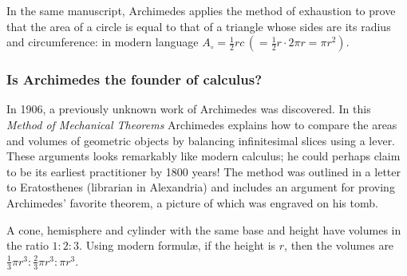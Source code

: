 In the same manuscript, Archimedes applies the method of exhaustion to prove that the area of a circle is equal to that of a triangle whose sides are its radius and circumference: in modern language $A_{\circ}=\frac 12rc \, (=\frac 12 r\cdot 2\pi r=\pi r^2).$ 


\pagebreak[3]


\subsubsection*{Is Archimedes the founder of calculus?}\label{pg:archmethod}

In 1906, a previously unknown work of Archimedes was discovered. In this \emph{Method of Mechanical Theorems} Archimedes explains how to compare the areas and volumes of geometric objects by balancing infinitesimal slices using a lever. These arguments looks remarkably like modern calculus; he could perhaps claim to be its earliest practitioner by 1800 years! The method was outlined in a letter to Eratosthenes (librarian in Alexandria) and includes an argument for proving Archimedes' favorite theorem, a picture of which was engraved on his tomb.

\begin{thm*}{}{}
	A cone, hemisphere and cylinder with the same base and height have volumes in the ratio $1:2:3$. Using modern formulæ, if the height is $r$, then the volumes are $\frac 13\pi r^3:\frac 23\pi r^3:\pi r^3$.
\end{thm*}

